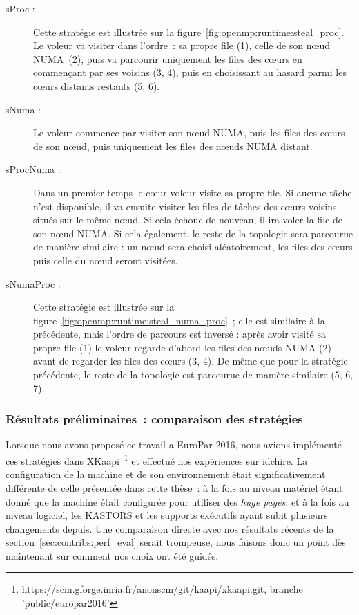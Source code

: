 \begin{description}
  \item [sProc :] Cette stratégie est illustrée sur la figure~\ref{fig:openmp:runtime:steal_proc}. Le voleur va visiter dans l'ordre~: sa propre file (1), celle de son nœud NUMA (2), puis va parcourir uniquement les files des cœurs en commençant par ses voisins (3, 4), puis en choisissant au hasard parmi les cœurs distants restants (5, 6).
  \item [sNuma :] Le voleur commence par visiter son nœud NUMA, puis les files des cœurs de son nœud, puis uniquement les files des nœuds NUMA distant.
  \item [sProcNuma :] Dans un premier temps le cœur voleur visite sa propre file. Si aucune tâche n'est disponible, il va ensuite visiter les files de tâches des cœurs voisins situés sur le même nœud.
    Si cela échoue de nouveau, il ira voler la file de son nœud NUMA.
    Si cela également, le reste de la topologie sera parcourue de manière similaire : un nœud sera choisi aléatoirement, les files des cœurs puis celle du nœud seront visitées.
  \item [sNumaProc :] Cette stratégie est illustrée sur la figure~\ref{fig:openmp:runtime:steal_numa_proc}~; elle est similaire à la précédente, mais l'ordre de parcours est inversé : après avoir visité sa propre file (1) le voleur regarde d'abord les files des nœuds NUMA (2) avant de regarder les files des cœurs (3, 4). De même que pour la stratégie précédente, le reste de la topologie est parcourue de manière similaire (5, 6, 7).
\end{description}

\subsubsection{Résultats préliminaires~: comparaison des stratégies}
\label{sec:openmp:runtime:preliminary_results}

Lorsque nous avons proposé ce travail a EuroPar 2016, nous avions implémenté ces stratégies dans XKaapi~\footnote{https://scm.gforge.inria.fr/anonscm/git/kaapi/xkaapi.git, branche 'public/europar2016'} et effectué nos expériences sur idchire.
La configuration de la machine et de son environnement était significativement différente de celle présentée dans cette thèse~: à la fois au niveau matériel étant donné que la machine était configurée pour utiliser des \emph{huge pages}, et à la fois au niveau logiciel, les KASTORS et les supports exécutifs ayant subit plusieurs changements depuis.
Une comparaison directe avec nos résultats récents de la section~\ref{sec:contribs:perf_eval} serait trompeuse, nous faisons donc un point dès maintenant sur comment nos choix ont été guidés.

